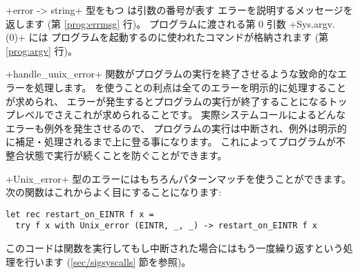 \ml+error -> string+ 型をもつ  は引数の番号が表す
エラーを説明するメッセージを返します (第 \ref{prog:errmsg} 行)。
プログラムに渡される第 0 引数 \ml+Sys.argv.(0)+ には
プログラムを起動するのに使われたコマンドが格納されます (第 \ref{prog:argv} 行)。

\ml+handle_unix_error+ 関数がプログラムの実行を終了させるような致命的なエラーを処理します。
\ocaml を使うことの利点は全てのエラーを明示的に処理することが求められ、
エラーが発生するとプログラムの実行が終了することになるトップレベルでさえこれが求められることです。
実際システムコールによるどんなエラーも例外を発生させるので、
プログラムの実行は中断され、例外は明示的に補足・処理されるまで上に登る事になります。
これによってプログラムが不整合状態で実行が続くことを防ぐことができます。

\ml+Unix_error+ 型のエラーにはもちろんパターンマッチを使うことができます。
次の関数はこれからよく目にすることになります:
%
\begin{lstlisting}
let rec restart_on_EINTR f x =
  try f x with Unix_error (EINTR, _, _) -> restart_on_EINTR f x
\end{lstlisting}
%
このコードは関数を実行してもし中断された場合にはもう一度繰り返すという処理を行います
(\ref{sec/sigsyscalls} 節を参照)。

